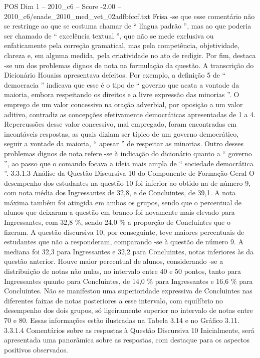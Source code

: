 \begin{textsample}{POS Dim 1 – 2010\_c6 – Score -2.00 – 2010\_c6/enade\_2010\_med\_vet\_02adfbfccf.txt}
Frisa -se que esse comentário não se restringe ao que se costuma chamar de “ língua padrão ”, mas ao que poderia ser chamado de “ excelência textual ”, que não se mede exclusiva ou enfaticamente pela correção gramatical, mas pela competência, objetividade, clareza e, em alguma medida, pela criatividade no ato de redigir.
Por fim, destaca -se um dos problemas dignos de nota na formulação da questão.
A transcrição do Dicionário Houaiss apresentava defeitos.
Por exemplo, a definição 5 de “ democracia ” indicava que esse é o tipo de “ governo que acata a vontade da maioria, embora respeitando os direitos e a livre expressão das minorias ”.
O emprego de um valor concessivo na oração adverbial, por oposição a um valor aditivo, contradiz as concepções efetivamente democráticas apresentadas de 1 a 4.
Repercussões desse valor concessivo, mal empregado, foram encontradas em incontáveis respostas, as quais diziam ser típico de um governo democrático, seguir a vontade da maioria, “ apesar ” de respeitar as minorias.
Outro desses problemas dignos de nota refere -se à indicação do dicionário quanto a “ governo ”, ao passo que o comando focava a ideia mais ampla de “ sociedade democrática ”. 3.3.1.3 Análise da Questão Discursiva 10 do Componente de Formação Geral O desempenho dos estudantes na questão 10 foi inferior ao obtido na de número 9, com nota média dos Ingressantes de 32,8, e de Concluintes, de 39,1.
A nota máxima também foi atingida em ambos os grupos, sendo que o percentual de alunos que deixaram a questão em branco foi novamente mais elevado para Ingressantes, com 32,8 \%, sendo 24,0 \% a proporção de Concluintes que o fizeram.
A questão discursiva 10, por conseguinte, teve maiores percentuais de estudantes que não a responderam, comparando -se à questão de número 9.
A mediana foi 32,3 para Ingressantes e 32,2 para Concluintes, notas inferiores às da questão anterior.
Houve maior percentual de alunos, considerando -se a distribuição de notas não nulas, no intervalo entre 40 e 50 pontos, tanto para Ingressantes quanto para Concluintes, de 14,0 \% para Ingressantes e 16,6 \% para Concluintes.
Não se manifestou uma superioridade expressiva de Concluintes nas diferentes faixas de notas posteriores a esse intervalo, com equilíbrio no desempenho dos dois grupos, só ligeiramente superior no intervalo de notas entre 70 e 80.
Essas informações estão ilustradas na Tabela 3.14 e no Gráfico 3.11. 3.3.1.4 Comentários sobre as respostas à Questão Discursiva 10 Inicialmente, será apresentada uma panorâmica sobre as respostas, com destaque para os aspectos positivos observados.

\end{textsample}
